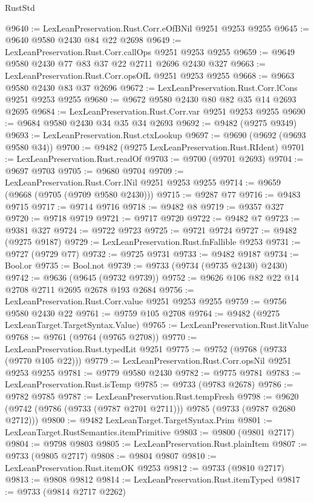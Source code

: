 \begin{lexlean}{RustStd}
\begin{coremodule}
@9640 := LexLeanPreservation.Rust.Corr.eOfBNil @9251 @9253 @9255
@9645 := @9640 @9580 @2430 @84 @22 @2698
@9649 := LexLeanPreservation.Rust.Corr.callOps @9251 @9253 @9255
@9659 := @9649 @9580 @2430 @77 @83 @37 @22 @2711 @2696 @2430 @327
@9663 := LexLeanPreservation.Rust.Corr.opsOfL @9251 @9253 @9255
@9668 := @9663 @9580 @2430 @83 @37 @2696
@9672 := LexLeanPreservation.Rust.Corr.lCons @9251 @9253 @9255
@9680 := @9672 @9580 @2430 @80 @82 @35 @14 @2693 @2695
@9684 := LexLeanPreservation.Rust.Corr.var @9251 @9253 @9255
@9690 := @9684 @9580 @2430 @34 @35 @34 @2693
@9692 := @9482 (@9275 @9349)
@9693 := LexLeanPreservation.Rust.ctxLookup
@9697 := @9690 (@9692 (@9693 @9580 @34))
@9700 := @9482 (@9275 LexLeanPreservation.Rust.RIdent)
@9701 := LexLeanPreservation.Rust.readOf
@9703 := @9700 (@9701 @2693)
@9704 := @9697 @9703
@9705 := @9680 @9704
@9709 := LexLeanPreservation.Rust.Corr.lNil @9251 @9253 @9255
@9714 := @9659 (@9668 (@9705 (@9709 @9580 @2430)))
@9715 := @9287 @77
@9716 := @9483 @9715
@9717 := @9714 @9716
@9718 := @9482 @8
@9719 := @9357 @327
@9720 := @9718 @9719
@9721 := @9717 @9720
@9722 := @9482 @7
@9723 := @9381 @327
@9724 := @9722 @9723
@9725 := @9721 @9724
@9727 := @9482 (@9275 @9187)
@9729 := LexLeanPreservation.Rust.fnFallible @9253
@9731 := @9727 (@9729 @77)
@9732 := @9725 @9731
@9733 := @9482 @9187
@9734 := Bool.or
@9735 := Bool.not
@9739 := @9733 (@9734 (@9735 @2430) @2430)
@9742 := @9636 (@9645 (@9732 @9739))
@9752 := @9626 @106 @82 @22 @14 @2708 @2711 @2695 @2678 @193 @2684
@9756 := LexLeanPreservation.Rust.Corr.value @9251 @9253 @9255
@9759 := @9756 @9580 @2430 @22
@9761 := @9759 @105 @2708
@9764 := @9482 (@9275 LexLeanTarget.TargetSyntax.Value)
@9765 := LexLeanPreservation.Rust.litValue
@9768 := @9761 (@9764 (@9765 @2708))
@9770 := LexLeanPreservation.Rust.typedLit @9251
@9775 := @9752 (@9768 (@9733 (@9770 @105 @22)))
@9779 := LexLeanPreservation.Rust.Corr.opsNil @9251 @9253 @9255
@9781 := @9779 @9580 @2430
@9782 := @9775 @9781
@9783 := LexLeanPreservation.Rust.isTemp
@9785 := @9733 (@9783 @2678)
@9786 := @9782 @9785
@9787 := LexLeanPreservation.Rust.tempFresh
@9798 := @9620 (@9742 (@9786 (@9733 (@9787 @2701 @2711))) @9785 (@9733 (@9787 @2680 @2712)))
@9800 := @9482 LexLeanTarget.TargetSyntax.Prim
@9801 := LexLeanTarget.RustSemantics.itemPrimitive
@9803 := @9800 (@9801 @2717)
@9804 := @9798 @9803
@9805 := LexLeanPreservation.Rust.plainItem
@9807 := @9733 (@9805 @2717)
@9808 := @9804 @9807
@9810 := LexLeanPreservation.Rust.itemOK @9253
@9812 := @9733 (@9810 @2717)
@9813 := @9808 @9812
@9814 := LexLeanPreservation.Rust.itemTyped
@9817 := @9733 (@9814 @2717 @2262)

\end{coremodule}
\end{lexlean}
